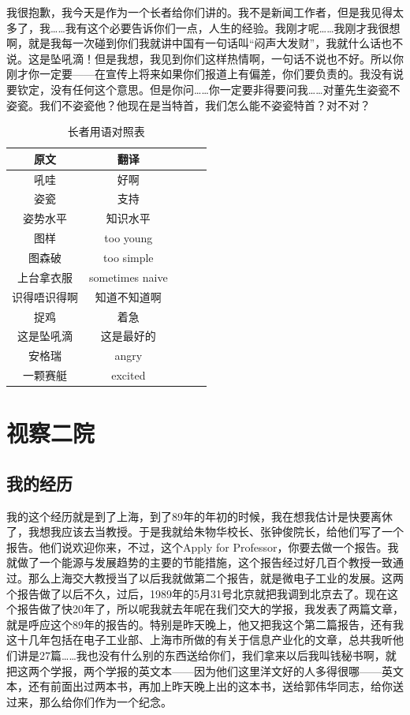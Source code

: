 我很抱歉，我今天是作为一个长者给你们讲的。我不是新闻工作者，但是我见得太多了，我……我有这个必要告诉你们一点，人生的经验。我刚才呢……我刚才我很想啊，就是我每一次碰到你们我就讲中国有一句话叫“闷声大发财”，我就什么话也不说。这是坠吼滴！但是我想，我见到你们这样热情啊，一句话不说也不好。所以你刚才你一定要——在宣传上将来如果你们报道上有偏差，你们要负责的。我没有说要钦定，没有任何这个意思。但是你问……你一定要非得要问我……对董先生姿瓷不姿瓷。我们不姿瓷他？他现在是当特首，我们怎么能不姿瓷特首？对不对？

\begin{table}[htbp]
	\caption{长者用语对照表}\label{table}
	\vspace{0.5em}\centering\wuhao
	\begin{tabular}{ccccc}
		\toprule[1.5pt]
		原文 & 翻译 \\
		\midrule[1pt]
		吼哇 & 好啊 \\
		姿瓷 & 支持 \\
		姿势水平 & 知识水平 \\
		图样 & too young \\
		图森破 & too simple \\
		上台拿衣服 & sometimes naive \\
		识得唔识得啊 & 知道不知道啊 \\
		捉鸡 & 着急 \\
		这是坠吼滴 & 这是最好的 \\
		安格瑞 & angry \\
		一颗赛艇 & excited \\
		\bottomrule[1.5pt]
	\end{tabular}
	\vspace{\baselineskip}
\end{table}



\chapter{视察二院}
\section{我的经历}
我的这个经历就是到了上海，到了89年的年初的时候，我在想我估计是快要离休了，我想我应该去当教授。于是我就给朱物华校长、张钟俊院长，给他们写了一个报告。他们说欢迎你来，不过，这个Apply for Professor，你要去做一个报告。我就做了一个能源与发展趋势的主要的节能措施，这个报告经过好几百个教授一致通过。那么上海交大教授当了以后我就做第二个报告，就是微电子工业的发展。这两个报告做了以后不久，过后，1989年的5月31号北京就把我调到北京去了。现在这个报告做了快20年了，所以呢我就去年呢在我们交大的学报，我发表了两篇文章，就是呼应这个89年的报告的。特别是昨天晚上，他又把我这个第二篇报告，还有我这十几年包括在电子工业部、上海市所做的有关于信息产业化的文章，总共我听他们讲是27篇……我也没有什么别的东西送给你们，我们拿来以后我叫钱秘书啊，就把这两个学报，两个学报的英文本——因为他们这里洋文好的人多得很哪——英文本，还有前面出过两本书，再加上昨天晚上出的这本书，送给郭伟华同志，给你送过来，那么给你们作为一个纪念。


